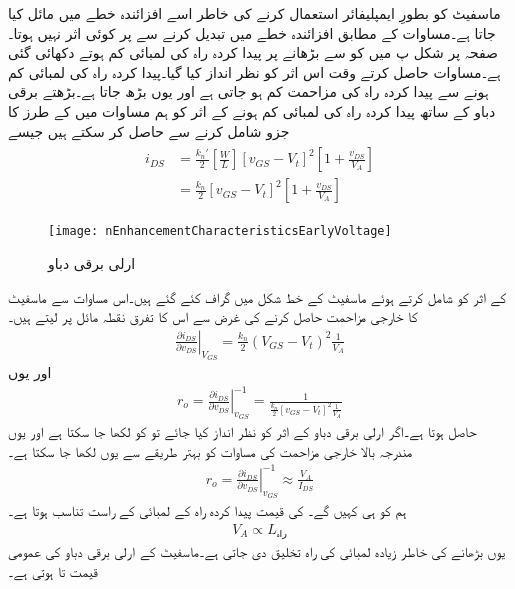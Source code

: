 ماسفیٹ کو بطورِ ایمپلیفائر استعمال کرنے کی خاطر اسے افزائندہ خطے میں مائل کیا جاتا ہے۔مساوات   کے مطابق افزائندہ خطے میں  تبدیل کرنے سے  پر کوئی اثر نہیں ہوتا۔صفحہ \pageref{شکل_بڑھاتے_ماسفیٹ_کے_خط_منفی}  پر شکل  پ میں   کو  سے بڑھانے پر پیدا کردہ راہ کی لمبائی کم ہوتے دکھائی گئی ہے۔مساوات   حاصل کرتے وقت اس اثر کو نظر انداز کیا گیا۔پیدا کردہ راہ کی لمبائی کم ہونے سے پیدا کردہ راہ کی مزاحمت کم ہو جاتی ہے اور یوں  بڑھ جاتا ہے۔بڑھتے برقی دباو کے ساتھ پیدا کردہ راہ کی لمبائی کم ہونے کے اثر کو ہم مساوات   میں    کے طرز کا جزو شامل کرنے سے حاصل کر سکتے ہیں جیسے
\begin{gather}
\begin{aligned}
i_{DS}&=\frac{k_n'}{2} \left[\frac{W}{L} \right ] \left[v_{GS}-V_t \right ]^{2} \left [1+\frac{v_{DS}}{V_A} \right ]\\
&=\frac{k_n}{2} \left[v_{GS}-V_t \right ]^{2} \left [1+\frac{v_{DS}}{V_A} \right ]
\end{aligned}
\end{gather}
%
\begin{figure}
\centering
\texttt{[image: nEnhancementCharacteristicsEarlyVoltage]}
\caption{ارلی برقی دباو}
\label{شکل_ماسفیٹ_ارلی_برقی_دباو}
\end{figure}

 کے اثر کو شامل کرتے ہوئے ماسفیٹ کے خط شکل  میں گراف کئے گئے ہیں۔اس مساوات سے ماسفیٹ کا خارجی مزاحمت حاصل کرنے کی غرض سے اس کا تفرق نقطہ مائل پر لیتے ہیں۔
\begin{align*}
\left . \frac{\partial i_{DS}}{\partial v_{DS}}  \right  |_{V_{GS}} = \frac{k_n}{2} \left(V_{GS}-V_t  \right)^2  \frac{1}{V_A}
\end{align*}
اور یوں 
\begin{align}
r_o=\left. \frac{\partial i_{DS}}{\partial v_{DS}} \right |_{v_{GS}}^{-1}=\frac{1}{\frac{k_n}{2} \left[v_{GS}-V_t \right ]^2 \frac{1}{V_A}}
\end{align}
حاصل ہوتا ہے۔اگر ارلی برقی دباو کے اثر کو نظر انداز کیا جائے تو  کو  لکھا جا سکتا ہے اور یوں مندرجہ بالا خارجی مزاحمت کی مساوات کو بہتر طریقے سے یوں لکھا جا سکتا ہے۔
\begin{align} \label{مساوات_میدانی_خارجی_مزاحمت}
r_o=\left. \frac{\partial i_{DS}}{\partial v_{DS}} \right |_{v_{GS}}^{-1} \approx \frac{V_A}{I_{DS}}
\end{align}
ہم  کو  ہی کہیں گے۔ کی قیمت پیدا کردہ راہ کے لمبائی کے  راست تناسب ہوتا ہے۔
\begin{align}
V_A \propto L_{\textrm{راہ}}
\end{align}
یوں  بڑھانے کی خاطر زیادہ لمبائی کی راہ تخلیق دی جاتی ہے۔ماسفیٹ کے ارلی برقی دباو کی عمومی قیمت  تا  ہوتی ہے۔

